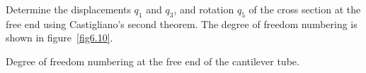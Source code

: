 \documentclass{AeroStructure-ERJohnson}
\begin{document}
\begin{example*}
Determine the displacements $q_1$ and $q_3$, and rotation $q_5$ of the cross section at the free end using Castigliano's second theorem. The degree of freedom numbering is shown in figure~\ref{fig6.10}.


{\caption{Degree of freedom numbering at the free end of the cantilever tube.}\label{fig6.10}}


\end{example*}
\end{document}

